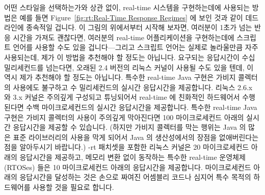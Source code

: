어떤 스타일을 선택하는가와 상관 없이, real-time 시스템을 구현하는데에 사용되는
방법은 예를 들면
Figure~\ref{fig:rt:Real-Time Response Regimes} 에 보인 것과 같이 데드라인에
종속적일 겁니다.
이 그림의 위에서부터 시작해 보자면, 여러분이 1초가 넘는 반응 시간을 가져도
괜찮다면, 여러분의 real-time 어플리케이션을 구현하는데에 스크립트 언어를 사용할
수도 있을 겁니다---그리고 스크립트 언어는 실제로 놀라울만큼 자주 사용되는데,
제가 이 방법을 추천해야 할 정도는 아닙니다.
요구되는 응답시간이 수십 밀리세컨드를 넘는다면, 오래된 2.4 버전의 리눅스 커널이
사용될 수도 있을 텐데, 이 역시 제가 추천해야 할 정도는 아닙니다.
특수한 real-time Java 구현은 가비지 콜렉터의 사용에도 불구하고 수 밀리세컨드의
실시간 응답시간을 제공합니다.
리눅스 2.6.x 와 3.x 커널은 주의깊게 구성되고 튜닝되어서 real-time 에 친화적인
하드웨어서 수행된다면 수백 마이크로세컨드의 실시간 응답시간을 제공합니다.
특수한 real-time Java 구현은 가비지 콜렉터의 사용이 주의깊게 막아진다면 100
마이크로세컨드 아래의 실시간 응답시간을 제공할 수 있습니다.
(하지만 가비지 콜렉터를 막는 행위는 Java 의 많은 표준 라이브러리의 사용을 막게
되어서 Java 의 생산성에서의 장점을 없애버린다는 점을 알아두시기 바랍니다.)
-rt 패치셋을 포함한 리눅스 커널은 20 마이크로세컨드 아래의 응답시간을 제공하고,
메모리 변환 없이 동작하는 특수한 real-time 운영체제 (RTOSes) 들은 10
마이크로세컨드 아래의 응답시간을 제공합니다.
마이크로세컨드 아래의 응답시간을 달성하는 것은 손으로 짜여진 어셈블리 코드나
심지어 특수 목적의 하드웨어를 사용할 것을 필요로 합니다.

